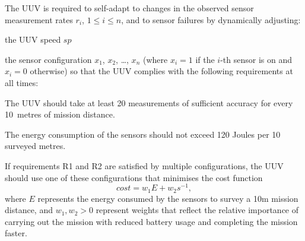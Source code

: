 The UUV is required to self-adapt to changes in the observed sensor measurement rates $r_i$, $1\leq i\leq n$, and to sensor failures by dynamically adjusting:
\squishlist
\item[(a)] the UUV speed $sp$
\item[(b)] the sensor configuration $x_1$, $x_2$, \ldots, $x_n$ (where $x_i=1$ if the $i$-th sensor is on and $x_i=0$ otherwise)
\squishend
so that the UUV complies with the following requirements at all times:
\squishlist
	\item[\textbf{R1}:] The UUV should take at least 20 measurements of sufficient accuracy for every 10~metres of mission distance.
	\item[\textbf{R2}:] The energy consumption of the sensors should not exceed 120 Joules per 10 surveyed metres.
	\item[\textbf{R3}:] If requirements R1 and R2 are satisfied by multiple configurations, the UUV should use one of these configurations that minimises the cost function
\begin{equation}
\label{eq:cost}
cost = w_1 E + w_2 s^{-1},
\end{equation}
where $E$ represents the energy consumed by the sensors to survey a 10m mission distance, and $w_1, w_2 >0$ represent weights that reflect the relative importance of carrying out the mission with reduced battery usage and completing the mission faster.
\squishend